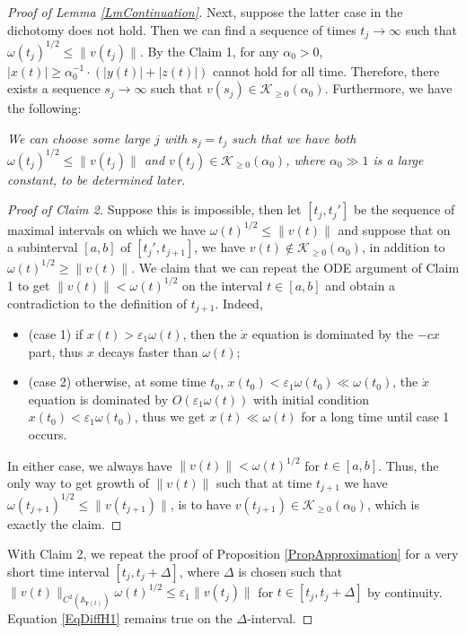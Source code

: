 \documentclass[11pt]{amsart}
\numberwithin{equation}{section}
\numberwithin{equation}{section}
\newcommand{\eps}{\varepsilon}
\newcommand{\cK}{\mathcal{K}}
\begin{document}
\begin{proof}[Proof of Lemma \ref{LmContinuation}]
		Next, suppose the latter case in the dichotomy does not hold. Then we can find a sequence of times $t_j\to\infty$ such that $\omega(t_j)^{1/2}\leq \|v(t_j)\|$. By the Claim 1, for any $\alpha_0>0$, $|x(t)|\geq \alpha_0^{-1}\cdot (|y(t)|+|z(t)|)$ cannot hold for all time. Therefore, there exists a sequence $s_j\to\infty$ such that $v(s_j)\in\cK_{\geq 0}(\alpha_0)$. Furthermore, we have the following:
		
		\medskip
		
		 {\it We can choose some large $j$ with $s_j=t_j$ such that we have 
			both $\omega(t_j)^{1/2}\leq \|v(t_j)\|$ and $v(t_j)\in\cK_{\geq 0}(\alpha_0)$, where $\alpha_0\gg1$ is a large constant, to be determined later.} 
		
		\begin{proof}[Proof of Claim 2]
			Suppose this is impossible, then let $[t_j,t_j']$ be the sequence of maximal intervals on which we have  $\omega(t)^{1/2}\leq \|v(t)\|$ and suppose that on a subinterval $[a,b]$ of $[t_j',t_{j+1}]$, we have $v(t)\notin\cK_{\geq 0}(\alpha_0)$, in addition to $\omega(t)^{1/2}\geq \|v(t)\|$. We claim that we can repeat the ODE argument of Claim 1 to get  $\|v(t)\|<\omega(t)^{1/2}$ on the interval $t\in [a,b]$ and obtain a contradiction to the definition of $t_{j+1}$. Indeed, 
			\begin{itemize}
				\item (case 1) if $x(t)>\eps_1 \omega(t)$, then the $\dot x$ equation is dominated by the $-c x$ part, thus $x$ decays faster than  $\omega(t)$;
				\item (case 2) otherwise, at some time $t_0$, $x(t_0)<\eps_1 \omega(t_0)\ll  \omega(t_0)$, the $\dot x$ equation is dominated by $O(\eps_1 \omega(t))$ with initial condition $x(t_0)<\eps_1 \omega(t_0)$, thus we get $x(t)\ll  \omega(t)$ for a long time until case 1 occurs. 
			\end{itemize}
			In either case, we always have $\|v(t)\|<\omega(t)^{1/2}$ for $t\in [a,b]$.   Thus, the only way to get growth of $\|v(t)\|$ such that at time $t_{j+1}$ we have $\omega(t_{j+1})^{1/2}\leq \|v(t_{j+1})\|$, is to have $v(t_{j+1})\in\cK_{\geq 0}(\alpha_0)$, which is exactly the claim.
		\end{proof} 
		
		With Claim 2, we repeat the proof of Proposition \ref{PropApproximation} for a very short time interval $[t_j,t_j+\Delta]$, where $\Delta$ is chosen such that $\|v(t)\|_{C^2(\mathbb A_{\mathbf r(t)})}\omega(t)^{1/2}\leq \eps_1\|v(t_j)\|$ for $t\in [t_j,t_j+\Delta]$ by continuity.	Equation \eqref{EqDiffH1} remains true on the $\Delta$-interval. 
		

\end{proof}
\end{document}
